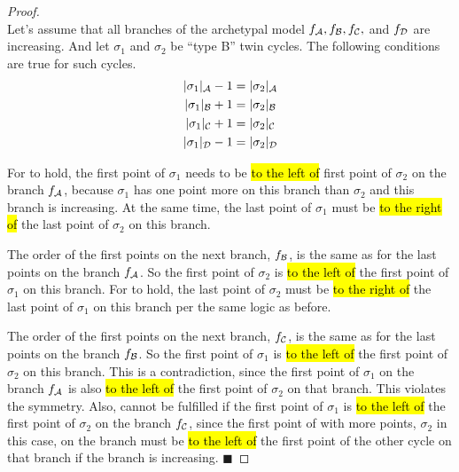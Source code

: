 \begin{proof} \phantom{x} \\
	Let's assume that all branches of the archetypal model $f_{\mathcal{A}}, f_{\mathcal{B}}, f_{\mathcal{C}},$ and $f_{\mathcal{D}}$ are increasing.
	And let $\sigma_1$ and $\sigma_2$ be ``type B'' twin cycles.
	The following conditions are true for such cycles.
	\begin{subequations}
		\begin{align}
			|\sigma_1|_{\mathcal{A}} - 1 & = |\sigma_2|_{\mathcal{A}} \label{equ:add.change.conseq.sigmaA} \\
			|\sigma_1|_{\mathcal{B}} + 1 & = |\sigma_2|_{\mathcal{B}} \label{equ:add.change.conseq.sigmaB} \\
			|\sigma_1|_{\mathcal{C}} + 1 & = |\sigma_2|_{\mathcal{C}} \label{equ:add.change.conseq.sigmaC} \\
			|\sigma_1|_{\mathcal{D}} - 1 & = |\sigma_2|_{\mathcal{D}} \label{equ:add.change.conseq.sigmaD}
		\end{align}
	\end{subequations}

	For  to hold, the first point of  $\sigma_1$ needs to be \hl{to the left of} first point of  $\sigma_2$ on the branch $f_{\mathcal{A}}$, because  $\sigma_1$ has one point more on this branch than  $\sigma_2$ and this branch is increasing.
	At the same time, the last point of  $\sigma_1$ must be \hl{to the right of} the last point of  $\sigma_2$ on this branch.

	The order of the first points on the next branch, $f_{\mathcal{B}}$, is the same as for the last points on the branch $f_{\mathcal{A}}$.
	So the first point of  $\sigma_2$ is \hl{to the left of} the first point of  $\sigma_1$ on this branch.
	For  to hold, the last point of  $\sigma_2$ must be \hl{to the right of} the last point of  $\sigma_1$ on this branch per the same logic as before.

	The order of the first points on the next branch, $f_{\mathcal{C}}$, is the same as for the last points on the branch $f_{\mathcal{B}}$.
	So the first point of  $\sigma_1$ is \hl{to the left of} the first point of  $\sigma_2$ on this branch.
	This is a contradiction, since the first point of  $\sigma_1$ on the branch $f_{\mathcal{A}}$ is also \hl{to the left of} the first point of  $\sigma_2$ on that branch.
	This violates the symmetry.
	Also,  cannot be fulfilled if the first point of  $\sigma_1$ is \hl{to the left of} the first point of  $\sigma_2$ on the branch $f_{\mathcal{C}}$, since the first point of  with more points, $\sigma_2$ in this case, on the branch must be \hl{to the left of} the first point of the other cycle on that branch if the branch is increasing.
	\hfill $\blacksquare$
\end{proof}
